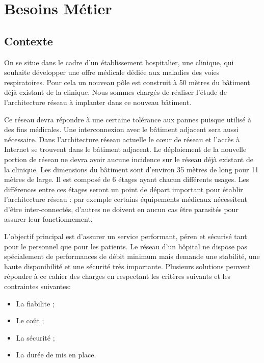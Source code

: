 \section{Besoins Métier}

%
%
\subsection{Contexte}

On se situe dans le cadre d'un établissement hospitalier, une clinique, qui souhaite développer une offre médicale dédiée aux maladies des voies respiratoires.
Pour cela un nouveau pôle est construit à 50 mètres du bâtiment déjà existant de la clinique.
Nous sommes chargés de réaliser l'étude de l'architecture réseau à implanter dans ce nouveau bâtiment.

%

Ce réseau devra répondre à une certaine tolérance aux pannes puisque utilisé à des fins médicales.
Une interconnexion avec le bâtiment adjacent sera aussi nécessaire.
Dans l'architecture réseau actuelle le cœur de réseau et l'accès à Internet se trouvent dans le bâtiment adjacent.
Le déploiement de la nouvelle portion de réseau ne devra avoir aucune incidence sur le réseau déjà existant de la clinique.
Les dimensions du bâtiment sont d'environ 35 mètres de long pour 11 mètres de large.
Il est composé de 6 étages ayant chacun différents usages.
Les différences entre ces étages seront un point de départ important pour établir l'architecture réseau :
par exemple certains équipements médicaux nécessitent d'être inter-connectés, d'autres ne doivent en aucun cas être parasités pour assurer leur fonctionnement.

%

L'objectif principal est d'assurer un service performant, péren et sécurisé tant pour le personnel que pour les patients.
Le réseau d'un hôpital ne dispose pas spécialement de performances de débit minimum mais demande une stabilité, une haute disponibilité et une sécurité très importante.
Plusieurs solutions peuvent répondre à ce cahier des charges en respectant les critères suivants et les contraintes suivantes:
\begin{itemize}
\item La fiabilite ;
\item Le coût ;
\item La sécurité ;
\item La durée de mis en place.
\end{itemize}

